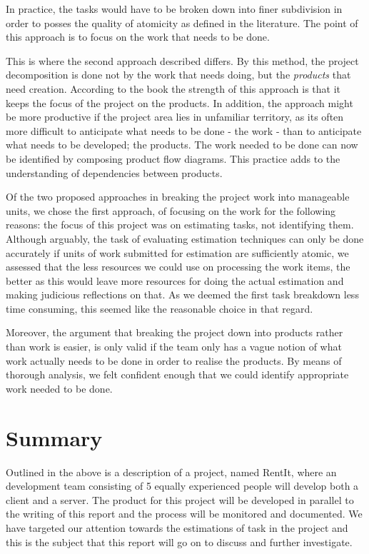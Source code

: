 In practice, the tasks would have to be broken down into finer subdivision in order to posses the quality of atomicity as defined in the literature. The point of this approach is to focus on the work that needs to be done.

This is where the second approach described differs. By this method, the project decomposition is done not by the work that needs doing, but the \textit{products}  that need creation. According to the book the strength of this approach is that it keeps the focus of the project on the products. In addition, the approach might be more productive if the project area lies in unfamiliar territory, as its often more difficult to anticipate what needs to be done - the work - than to anticipate what needs to be developed; the products. The work needed to be done can now be identified by composing product flow diagrams. This practice adds to the understanding of dependencies between products.

Of the two proposed approaches in breaking the project work into manageable units, we chose the first approach, of focusing on the work for the following reasons: the focus of this project was on estimating tasks, not identifying them. Although arguably, the task of evaluating estimation techniques can only be done accurately if units of work submitted for estimation are sufficiently atomic, we assessed that the less resources we could use on processing the work items, the better as this would leave more resources for doing the actual estimation and making judicious reflections on that. As we deemed the first task breakdown less time consuming, this seemed like the reasonable choice in that regard.

Moreover, the argument that breaking the project down into products rather than work is easier, is only valid if the team only has a vague notion of what work actually needs to be done in order to realise the products. By means of thorough analysis, we felt confident enough that we could identify appropriate work needed to be done.


\section{Summary}
Outlined in the above is a description of a project, named RentIt, where an development team consisting of 5 equally experienced people will develop both a client and a server. The product for this project will be developed in parallel to the writing of this report and the process will be monitored and documented. We have targeted our attention towards the estimations of task in the project and this is the subject that this report will go on to discuss and further investigate. 
